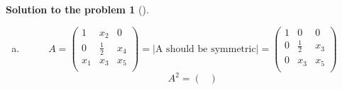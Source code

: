 \documentclass[12pt,a4]{article}
\newtheorem{solution}{Solution to the problem}
\newcommand{\answer}[1]{\textbf{Answer:} #1}
\begin{document}
{\begin{solution}[]
\begin{enumerate}[(a)]
\[%
\frac12
\begin{pmatrix}[rrr]
1 & 1 & -1 \\
0 & 2 & 0 \\
-1 & 1 & 1\\
\end{pmatrix}
\]
In fact if $P_{(a)}$ is a projector from task (a), and $P_{(b)}$ -- from task (b), then $P_{(b)} = I - P_{(a)}$, since $U_{(a)} = W_{(b)}$. Let's check:
\[
I - P_{(a)} = 
\frac12 \left (
\begin{pmatrix}[rrr]
2 & 0 & 0 \\
0 & 2 & 0 \\
0 & 0 & 2\\
\end{pmatrix}
-
\begin{pmatrix}[rrr]
1 & -1 & 1 \\
0 & 0 & 0  \\
1 & -1 & 1 \\
\end{pmatrix}
\right )
=
\frac12
\begin{pmatrix}[rrr]
1 & 1 & -1 \\
0 & 2 & 0 \\
-1 & 1 & 1\\
\end{pmatrix}
=
P_{(b)}
\]
\answer{$P =
\frac12
\begin{pmatrix}[rrr]
1 & 1 & -1 \\
0 & 2 & 0 \\
-1 & 1 & 1\\
\end{pmatrix}
$}
	\item
\[
A = 
\begin{pmatrix}
1 & x_2 & 0 \\
0 & \frac{1}{2} & x_4 \\
x_1 & x_3 & x_5 \\
\end{pmatrix}
 =
 \left | \text{A should be symmetric} \right |
 =
\begin{pmatrix}
1 & 0 & 0 \\
0 & \frac{1}{2} & x_3 \\
0 & x_3 & x_5 \\
\end{pmatrix}
\]
\[
A ^2 = 
\begin{pmatrix}

\end{pmatrix}\]
\end{enumerate}
\end{solution}}
\end{document}
